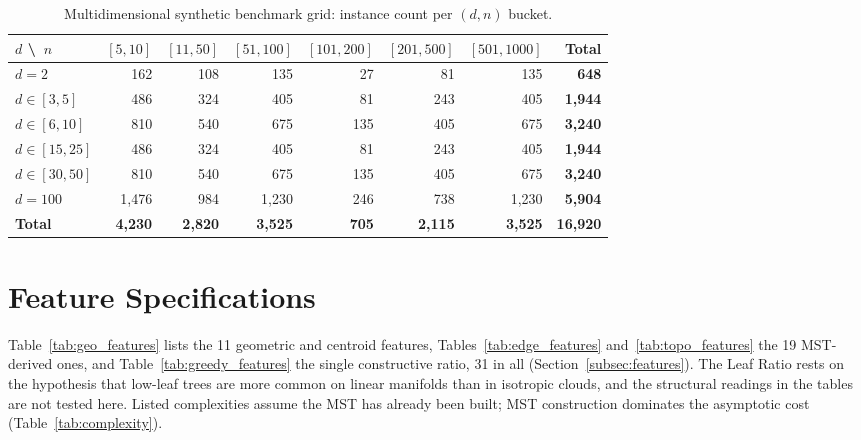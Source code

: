 \documentclass{article}
\begin{document}
\begin{table}[tbp]
\centering
\caption{Multidimensional synthetic benchmark grid: instance count per $(d, n)$ bucket.}
\label{tab:nd_grid_counts}
{%
\footnotesize
\begin{tabular}{@{}l rrrrrr r@{}}
\toprule
$d$ \textbackslash\ $n$ & $[5,10]$ & $[11,50]$ & $[51,100]$ & $[101,200]$ & $[201,500]$ & $[501,1000]$ & Total \\
\midrule
$d=2$ & 162 & 108 & 135 & 27 & 81 & 135 & \textbf{648} \\
$d\in[3,5]$ & 486 & 324 & 405 & 81 & 243 & 405 & \textbf{1{,}944} \\
$d\in[6,10]$ & 810 & 540 & 675 & 135 & 405 & 675 & \textbf{3{,}240} \\
$d\in[15,25]$ & 486 & 324 & 405 & 81 & 243 & 405 & \textbf{1{,}944} \\
$d\in[30,50]$ & 810 & 540 & 675 & 135 & 405 & 675 & \textbf{3{,}240} \\
$d=100$ & 1{,}476 & 984 & 1{,}230 & 246 & 738 & 1{,}230 & \textbf{5{,}904} \\
\midrule
\textbf{Total} & \textbf{4{,}230} & \textbf{2{,}820} & \textbf{3{,}525} & \textbf{705} & \textbf{2{,}115} & \textbf{3{,}525} & \textbf{16{,}920} \\
\bottomrule
\end{tabular}%
}
\end{table}

\section{Feature Specifications} \label{app:features}

Table~\ref{tab:geo_features} lists the 11 geometric and centroid features, Tables~\ref{tab:edge_features} and~\ref{tab:topo_features} the 19 MST-derived ones, and Table~\ref{tab:greedy_features} the single constructive ratio, 31 in all (Section~\ref{subsec:features}). The Leaf Ratio rests on the hypothesis that low-leaf trees are more common on linear manifolds than in isotropic clouds, and the structural readings in the tables are not tested here. Listed complexities assume the MST has already been built; MST construction dominates the asymptotic cost (Table~\ref{tab:complexity}).
\end{document}
